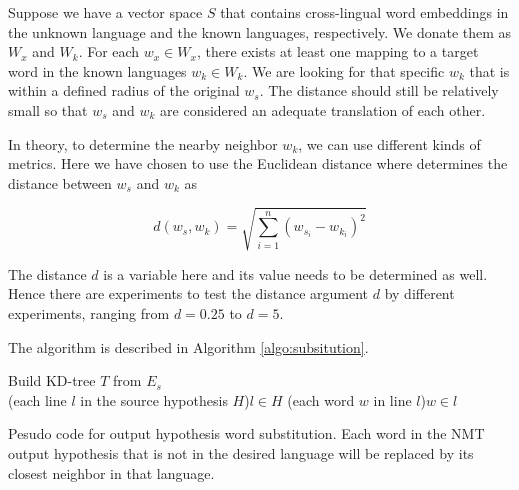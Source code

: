 \documentclass[thesis]{cluu}
\begin{document}
Suppose we have a vector space $S$ that contains cross-lingual word embeddings in the unknown language and the known languages, respectively. We donate them as $W_x$ and $W_k$. For each $w_x\in W_x$, there exists at least one mapping to a target word in the known languages $w_k \in W_k$. We are looking for that specific $w_k$ that is within a defined radius of the original $w_s$. The distance should still be relatively small so that $w_s$ and $w_k$ are considered an adequate translation of each other.

In theory, to determine the nearby neighbor $w_k$, we can use different kinds of metrics. Here we have chosen to use the Euclidean distance where determines the distance between $w_s$ and $w_k$ as

\begin{equation}
  d(w_s, w_k)=\sqrt{\sum_{i=1}^n{(w_{s_i}-w_{k_i})}^2}
\end{equation}

The distance $d$ is a variable here and its value needs to be determined as well. Hence there are experiments to test the distance argument $d$ by different experiments, ranging from $d=0.25$ to $d=5$.

The algorithm is described in Algorithm \ref{algo:subsitution}.

\begin{algorithm}[h]
  \SetAlgoLined

  Build KD-tree $T$ from $E_s$ \\
  \For(each line $l$ in the source hypothesis $H$){$l \in H$}{
    \For(each word $w$ in line $l$){$w \in l$}{
    }
  }
  \caption{Pesudo code for output hypothesis word substitution. Each word in the NMT output hypothesis that is not in the desired language will be replaced by its closest neighbor in that language.}
  \label{algo:subsitution}
\end{algorithm}
\end{document}
